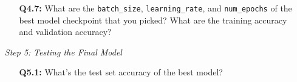 \documentclass{article}
\begin{document}
\begin{itemize}
\begin{itemize}
        \item[\textbf{Q4.7:}] What are the \texttt{batch\_size},
        \texttt{learning\_rate}, and \texttt{num\_epochs} of the best model
        checkpoint that you picked? What are the training accuracy and
        validation accuracy?
    \end{itemize}
    
    \item[\textit{Step 5:}] \textit{Testing the Final Model}
    \begin{itemize}
        \item[\textbf{Q5.1:}] What's the test set accuracy of the best model?
    \end{itemize}
    
\end{itemize}
\end{document}
